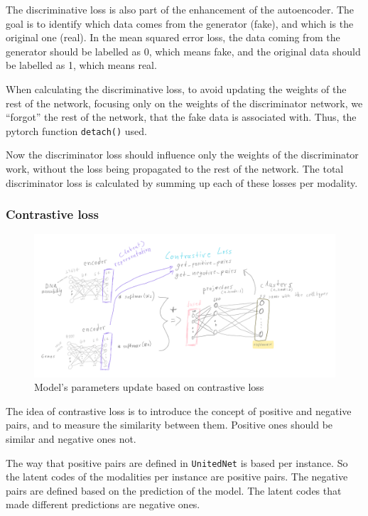 \documentclass[12pt, a4paper]{article}
\begin{document}
The discriminative loss is also part of the enhancement of the autoencoder. The goal is to identify which data comes from the generator (fake), and which is the original one (real). In the mean squared error loss, the data coming from the generator should be labelled as 0, which means fake, and the original data should be labelled as 1, which means real.

When calculating the discriminative loss, to avoid updating the weights of the rest of the network, focusing only on the weights of the discriminator network, we “forgot” the rest of the network, that the fake data is associated with. Thus, the pytorch function \verb|detach()| used. 

Now the discriminator loss should influence only the weights of the discriminator work, without the loss being propagated to the rest of the network. The total discriminator loss is calculated by summing up each of these losses per modality.

\clearpage


\subsubsection{Contrastive loss}

\begin{figure}[h!]
  \centering
  \includegraphics[width=\textwidth]{contrastive_loss.png}
  \caption{Model's parameters update based on contrastive loss}
\end{figure}

The idea of contrastive loss is to introduce the concept of positive and negative pairs, and to measure the similarity between them. Positive ones should be similar and negative ones not.

The way that positive pairs are defined in \verb|UnitedNet| is based per instance. So the latent codes of the modalities per instance are positive pairs. The negative pairs are defined based on the prediction of the model. The latent codes that made different predictions are negative ones.
\end{document}
